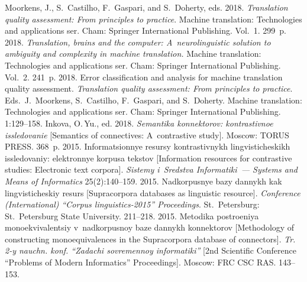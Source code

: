   \begin{multicols}{2}

\renewcommand{\bibname}{\protect\rmfamily References}

{\small\frenchspacing
 {%
 \begin{thebibliography}{99}
Moorkens, J., S.~Castilho, F.~Gaspari, and S.~Doherty, eds. 
2018. \textit{Translation quality 
assessment: From principles to practice}. 
Machine translation: Technologies and applications ser.  Cham: Springer 
International Publishing. Vol.~1. 299~p.
 2018. \textit{Translation, brains and the computer:
A~neurolinguistic solution to ambiguity and 
complexity in machine translation.} Machine translation: 
Technologies and applications ser.  Cham: Springer International Publishing. 
Vol.~2. 241~p.
 2018. Error classification and analysis for machine 
translation quality assessment. \textit{Translation quality assessment:
From principles to practice}. 
Eds.\ J.~Moorkens, S.~Castilho, F.~Gaspari, and S.~Doherty. 
Machine translation:  Technologies and applications ser. 
Cham: Springer International Publishing. 1:129--158.
Inkova, O.\,Yu., ed. 2018. \textit{Semantika konnektorov: kontrastivnoe issledovanie} [Semantics 
of connectives: A~contrastive study]. Moscow: TORUS PRESS. 368~p.
 2015. Informatsionnye resursy kontrastivnykh lingvisticheskikh 
issledovaniy: elektronnye kor\-pu\-sa tekstov [Information resources for contrastive studies: Electronic 
text corpora]. \textit{Sistemy i~Sredstva Informatiki~--- Systems and Means of Informatics}  
25(2):140--159.
 2015. 
Nadkorpusnye bazy dannykh kak lingvisticheskiy resurs [Supracorpora databases as linguistic 
resource]. \textit{Conference 
(International) ``Corpus linguistics-2015'' Proceedings}. St.\ Petersburg: St.\ Petersburg State 
University. 211--218.
 2015. Metodika 
postroeniya monoekvivalentsiy v~nadkorpusnoy baze dannykh konnektorov [Methodology of 
constructing monoequivalences in the Supracorpora database of connectors]. \textit{Tr. 2-y nauchn. 
konf. ``Zadachi sovremennoy informatiki''} [2nd Scientific Conference ``Problems of Modern 
Informatics'' Proceedings]. Moscow: FRC CSC RAS. 143--153.

\end{thebibliography}}}
\end{multicols}
